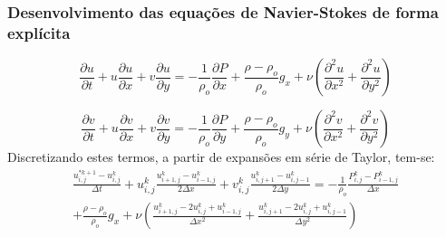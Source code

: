 \documentclass[xcolor=dvipsnames,10pt,aspectratio=169]{beamer}
\begin{document}
	
	\begin{frame}
		\frametitle{Desenvolvimento das equações de Navier-Stokes de forma explícita}
		\centering
		\begin{equation}
			\frac{\partial u}{\partial t} + u\frac{\partial u}{\partial x} + v\frac{\partial u}{\partial y} =  -\frac{1}{\rho_o} \frac{\partial P}{\partial x} + \frac{\rho - 	\rho_o}{\rho_o} g_x + \nu \left( \frac{\partial ^2 u}{\partial x^2} + \frac{\partial ^2 u}{\partial y^2} \right)
		\end{equation}
	
		\begin{equation}
			\frac{\partial v}{\partial t} + u\frac{\partial v}{\partial x} + v\frac{\partial v}{\partial y} =  -\frac{1}{\rho_o} \frac{\partial P}{\partial y} + \frac{\rho - \rho_o}{\rho_o} g_y + \nu \left( \frac{\partial ^2 v}{\partial x^2} + \frac{\partial ^2 v}{\partial y^2} \right)
		\end{equation}
		Discretizando estes termos, a partir de expansões em série de Taylor, tem-se:
		\begin{equation}
			\begin{split}
			\frac{u_{i , j}^{\ast k + 1} - u_{i , j}^{k}}{\Delta t} + u_{i , j}^{k}\frac{u_{i + 1 , j}^k - u_{i - 1 , j}^k  }{2 \Delta x} + v_{i , j}^{k}\frac{u_{i , j+ 1}^k - u_{i, j-1}^k  }{2 \Delta y} =  -\frac{1}{\rho_o} \frac{P_{i, j}^k - P_{i - 1, j}^k}{\Delta x} \\ + \frac{\rho - 	\rho_o}{\rho_o} g_x + \nu \left( \frac{u_{i+1 , j}^{k} - 2 u_{i,j}^{k} + u_{i-1,j}^{k}}{\Delta x^2} + \frac{u_{i , j+1}^{k} - 2 u_{i,j}^{k} + u_{i,j-1}^{ k}}{\Delta y^2} \right)
			\end{split}
		\end{equation}
		
	
	\end{frame}
\end{document}
